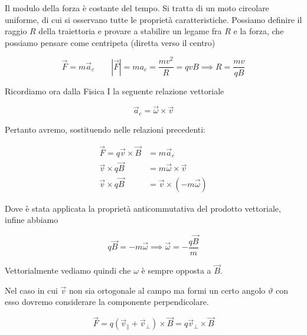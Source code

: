Il modulo della forza è costante del tempo. Si tratta di un moto circolare uniforme, di cui si osservano tutte le proprietà caratteristiche. Possiamo definire il raggio $ R $ della traiettoria e provare a stabilire un legame fra $ R $ e la forza, che possiamo pensare come centripeta (diretta verso il centro)

\[
	\vec{F} =m\vec{a}_c \qquad |\vec{F} |=m a_c=\frac{mv^2}{R}=qvB \implies \boxed{R=\frac{mv}{qB}}
\]

Ricordiamo ora dalla Fisica I la seguente relazione vettoriale

\[
	\vec{a}_c=\vec{\omega} \times \vec{v}
\]

Pertanto avremo, sostituendo nelle relazioni precedenti:

\begin{equation*}
	\begin{aligned}
		\vec{F} =q\vec{v} \times \vec{B} &= m\vec{a}_c \\
		\vec{v} \times q\vec{B}  &= m\vec{\omega} \times \vec{v} \\
		\vec{v} \times q\vec{B}  &=\vec{v} \times (-m\vec{\omega} )
	\end{aligned}
\end{equation*}

Dove è stata applicata la proprietà anticommutativa del prodotto vettoriale, infine abbiamo

\[
	q\vec{B} = -m\vec{\omega} \implies \boxed{\vec{\omega} = -\frac{q\vec{B}}{m}}
\]

Vettorialmente vediamo quindi che $ \omega $ è sempre opposta a $\vec{B}$.

Nel caso in cui $\vec{v}$ non sia ortogonale al campo ma formi un certo angolo $\vartheta$ con esso dovremo considerare la componente perpendicolare.

\[
	\vec{F} =q(\vec{v}_{\parallel}+\vec{v}_{\bot})\times \vec{B} = q\vec{v}_{\bot}\times \vec{B}
\]

